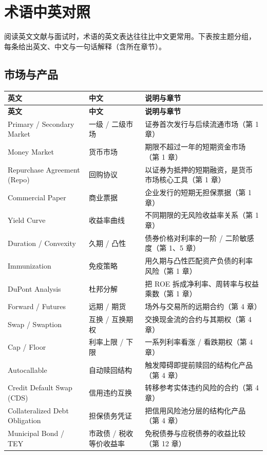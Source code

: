 \chapter{术语中英对照}
\label{app:glossary}

阅读英文文献与面试时，术语的英文表达往往比中文更常用。下表按主题分组，
每条给出英文、中文与一句话解释（含所在章节）。

\section{市场与产品}

{\tablefont
\begin{longtable}{@{}L{4.6cm}L{3.6cm}L{6.6cm}@{}}
\toprule
\textbf{英文} & \textbf{中文} & \textbf{说明与章节} \\
\midrule
\endfirsthead
\toprule
\textbf{英文} & \textbf{中文} & \textbf{说明与章节} \\
\midrule
\endhead
\bottomrule
\endlastfoot
Primary / Secondary Market & 一级 / 二级市场 & 证券首次发行与后续流通市场（第 1 章） \\
Money Market & 货币市场 & 期限不超过一年的短期资金市场（第 1 章） \\
Repurchase Agreement (Repo) & 回购协议 & 以证券为抵押的短期融资，是货币市场核心工具（第 1 章） \\
Commercial Paper & 商业票据 & 企业发行的短期无担保票据（第 1 章） \\
Yield Curve & 收益率曲线 & 不同期限的无风险收益率关系（第 1 章） \\
Duration / Convexity & 久期 / 凸性 & 债券价格对利率的一阶 / 二阶敏感度（第 1、5 章） \\
Immunization & 免疫策略 & 用久期与凸性匹配资产负债的利率风险（第 1 章） \\
DuPont Analysis & 杜邦分解 & 把 ROE 拆成净利率、周转率与权益乘数（第 1 章） \\
Forward / Futures & 远期 / 期货 & 场外与交易所的远期合约（第 4 章） \\
Swap / Swaption & 互换 / 互换期权 & 交换现金流的合约与其期权（第 4 章） \\
Cap / Floor & 利率上限 / 下限 & 一系列利率看涨 / 看跌期权（第 4 章） \\
Autocallable & 自动赎回结构 & 触发障碍即提前赎回的结构化产品（第 4 章） \\
Credit Default Swap (CDS) & 信用违约互换 & 转移参考实体违约风险的合约（第 4 章） \\
Collateralized Debt Obligation & 担保债务凭证 & 把信用风险池分层的结构化产品（第 4 章） \\
Municipal Bond / TEY & 市政债 / 税收等价收益率 & 免税债券与应税债券的收益比较（第 12 章） \\
\end{longtable}
}

